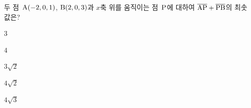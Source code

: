두 점~$\mathrm{A}(-2{,}\mkern3mu\mathopen{}0{,}\mkern3mu\mathopen{}1)$, $\mathrm{B}(2{,}\mkern3mu\mathopen{}0{,}\mkern3mu\mathopen{}3)$과 $x$축 위를 움직이는 점~$\mathrm{P}$에 대하여 $\overline{\mathrm{AP}}+\overline{\mathrm{PB}}$의 최솟값은?
\begin{choices32}{\rule[-3ex]{0pt}{8ex}$3$}{\rule[-3ex]{0pt}{8ex}$4$}{\rule[-3ex]{0pt}{8ex}$3\sqrt{2}$}{\rule[-3ex]{0pt}{8ex}$4\sqrt{2}$}{\rule[-3ex]{0pt}{8ex}$4\sqrt{3}$}\end{choices32}
